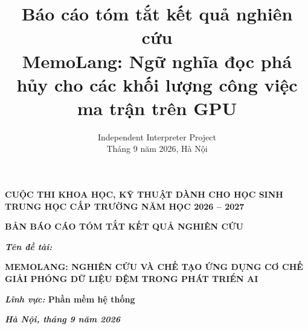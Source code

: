 \documentclass[a4paper]{article}
\begin{document}
	
	\title{Báo cáo tóm tắt kết quả nghiên cứu \\
		{\large MemoLang: Ngữ nghĩa đọc phá hủy cho các khối lượng công việc ma trận trên GPU}}
	
	\author{
		Independent Interpreter Project\\
		Tháng 9 năm 2026, Hà Nội}
	
	\thispagestyle{plain}
	\begin{center}
		\bfseries
		CUỘC THI KHOA HỌC, KỸ THUẬT DÀNH CHO HỌC SINH TRUNG HỌC CẤP TRƯỜNG NĂM HỌC 2026 -- 2027
	\end{center}
	
	\vspace{5cm}
	
	\begin{center}
		\bfseries
		BẢN BÁO CÁO TÓM TẮT KẾT QUẢ NGHIÊN CỨU
	\end{center}
	
	\vspace{3cm}
	
	\begin{center}
		{\Large\bfseries\itshape Tên đề tài:}\\[10pt]
		{\Large\bfseries
		\MakeUppercase{MemoLang: Nghiên cứu và chế tạo ứng dụng cơ chế giải phóng dữ liệu đệm trong phát triển AI}\par}
	\end{center}
	
	\vspace{3cm}
	
	\noindent\textbf{\textit{Lĩnh vực:} Phần mềm hệ thống}
	
	\vspace{6pt}
	
	\vfill
	
	\begin{center}
		\textbf{\textit{Hà Nội, tháng 9 năm 2026}}
	\end{center}
	
	\newpage
	
	\tableofcontents
	
	\listoffigures
	\listoftables
	
\end{document}
